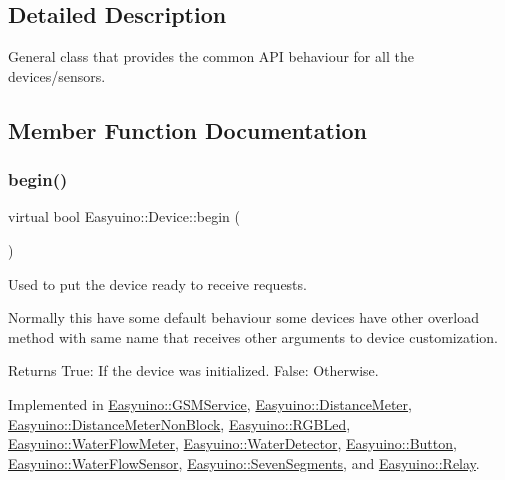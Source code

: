 \subsection{Detailed Description}
General class that provides the common A\+PI behaviour for all the devices/sensors. 

\subsection{Member Function Documentation}
\mbox{\label{class_easyuino_1_1_device_a2e7bb2fec849719a9d9432b57cdb72ba}} 
\subsubsection{\texorpdfstring{begin()}{begin()}}
{\footnotesize\ttfamily virtual bool Easyuino\+::\+Device\+::begin (\begin{DoxyParamCaption}{ }\end{DoxyParamCaption})\hspace{0.3cm}{\ttfamily [pure virtual]}}



Used to put the device ready to receive requests. 

Normally this have some default behaviour some devices have other overload method with same name that receives other arguments to device customization. \begin{DoxyReturn}{Returns}
True\+: If the device was initialized. False\+: Otherwise. 
\end{DoxyReturn}


Implemented in \hyperlink{class_easyuino_1_1_g_s_m_service_aeafc2dae47e4b13e127eb228a0f7ff6a}{Easyuino\+::\+G\+S\+M\+Service}, \hyperlink{class_easyuino_1_1_distance_meter_a0374e6f806cd71f0f918c6ea7b7700a0}{Easyuino\+::\+Distance\+Meter}, \hyperlink{class_easyuino_1_1_distance_meter_non_block_a46d2093d0fc125e98c3602868c088a77}{Easyuino\+::\+Distance\+Meter\+Non\+Block}, \hyperlink{class_easyuino_1_1_r_g_b_led_abdc3512266c7f584609147fccc1ec816}{Easyuino\+::\+R\+G\+B\+Led}, \hyperlink{class_easyuino_1_1_water_flow_meter_a400c25b10a7cde45c623805546d071cd}{Easyuino\+::\+Water\+Flow\+Meter}, \hyperlink{class_easyuino_1_1_water_detector_af7a0ec32d6abcb8c1060f493525d5228}{Easyuino\+::\+Water\+Detector}, \hyperlink{class_easyuino_1_1_button_a3505f6abb646e92130701d5a1b285c76}{Easyuino\+::\+Button}, \hyperlink{class_easyuino_1_1_water_flow_sensor_a55dcab6c527b1e1951a1fff69efdb763}{Easyuino\+::\+Water\+Flow\+Sensor}, \hyperlink{class_easyuino_1_1_seven_segments_ab59d5cbdc22567fb97854f32d899e02d}{Easyuino\+::\+Seven\+Segments}, and \hyperlink{class_easyuino_1_1_relay_a920a0fa287cacfd8c6df19d8812d4958}{Easyuino\+::\+Relay}.

